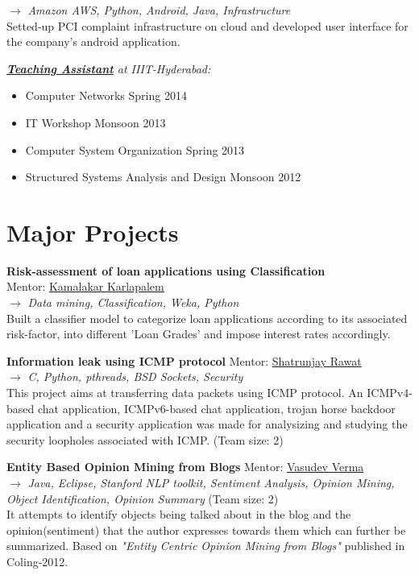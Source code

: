 \documentclass[margin]{res}
\begin{document}
\begin{resume}
\begin{itemize}
\hypersetup{urlcolor=blue}
$\rightarrow$ {\it Amazon AWS, Python, Android, Java, Infrastructure } \\
 Setted-up PCI complaint infrastructure on cloud and developed user interface for the company's android application.   
\end{itemize} 

{\sl \underline{\bf Teaching Assistant} at IIIT-Hyderabad: } 
\begin{itemize}
\item Computer Networks \hfill{Spring 2014}
\item IT Workshop  \hfill{Monsoon 2013}
\item Computer System Organization \hfill{Spring 2013}
\item Structured Systems Analysis and Design \hfill{Monsoon 2012}
\end{itemize}



\section{Major Projects}
{\bf Risk-assessment of loan applications using Classification } \\ \hfill{Mentor: \href{http://iiit.ac.in/people/faculty/kamal}{Kamalakar Karlapalem}}  \\
$\rightarrow$ {\it Data mining, Classification, Weka, Python  } \\
Built a classifier model to categorize loan applications according to its associated risk-factor, into different 'Loan Grades' and impose interest rates accordingly.


{\bf Information leak using ICMP protocol} \hfill{Mentor: \href{http://iiit.ac.in/people/faculty/shatrunjay.rawat}{Shatrunjay Rawat}}  \\
$\rightarrow$ {\it C, Python, pthreads, BSD Sockets, Security } \\
This project aims at transferring data packets using ICMP protocol. An ICMPv4-based chat application, ICMPv6-based chat application, trojan horse backdoor application and a security application was made for analysizing and studying the security loopholes associated with ICMP. \hfill{(Team size: 2)}

{\bf Entity Based Opinion Mining from Blogs} \hfill{Mentor: \href{http://faculty.iiit.ac.in/~vv/Home.html}{Vasudev Verma}} \\
$\rightarrow$ {\it Java, Eclipse, Stanford NLP toolkit, Sentiment Analysis, Opinion Mining, Object Identification, Opinion Summary
} \hfill{(Team size: 2)} \\
It attempts to identify objects being
talked about in the blog and the opinion(sentiment) that the author expresses
towards them which can further be summarized. 
Based on {\it "Entity Centric Opinion Mining from Blogs"} published in Coling-2012. 


\end{resume}
\end{document}
